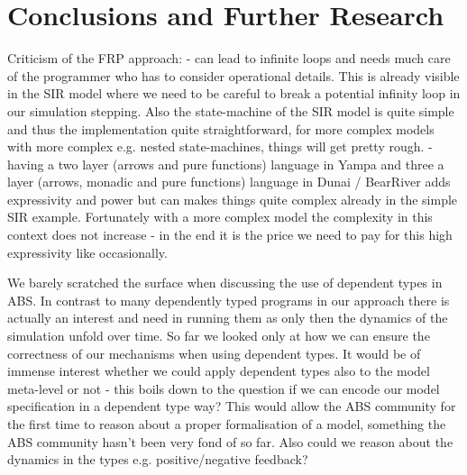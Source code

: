 \section{Conclusions and Further Research}
Criticism of the FRP approach:
- can lead to infinite loops and needs much care of the programmer who has to consider operational details. This is already visible in the SIR model where we need to be careful to break a potential infinity loop in our simulation stepping. Also the state-machine of the SIR model is quite simple and thus the implementation quite straightforward, for more complex models with more complex e.g. nested state-machines, things will get pretty rough.
- having a two layer (arrows and pure functions) language in Yampa \cite{jeffrey_causality_2013} and three a layer (arrows, monadic and pure functions) language in Dunai / BearRiver adds expressivity and power but can makes things quite complex already in the simple SIR example. Fortunately with a more complex model the complexity in this context does not increase - in the end it is the price we need to pay for this high expressivity like occasionally.

We barely scratched the surface when discussing the use of dependent types in ABS. In contrast to many dependently typed programs in our approach there is actually an interest and need in running them as only then the dynamics of the simulation unfold over time. So far we looked only at how we can ensure the correctness of our mechanisms when using dependent types. It would be of immense interest whether we could apply dependent types also to the model meta-level or not - this boils down to the question if we can encode our model specification in a dependent type way? This would allow the ABS community for the first time to reason about a proper formalisation of a model, something the ABS community hasn't been very fond of so far. Also could we reason about the dynamics in the types e.g. positive/negative feedback?